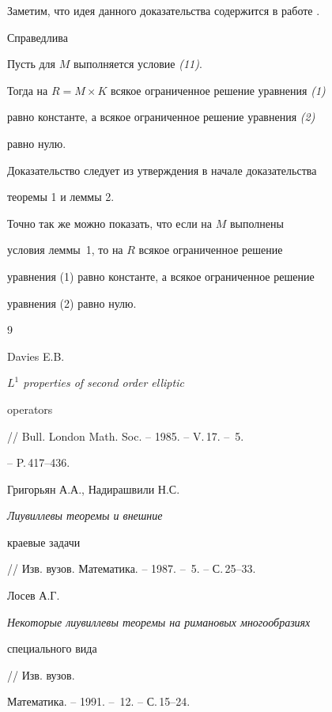 Заметим, что идея данного доказательства содержится в работе \cite{Gri}.





Справедлива





\begin{thm} Пусть для $M$ выполняется условие {\em (11)}.


Тогда на $R = M \times K$ всякое ограниченное решение уравнения {\em (1)}


равно константе, а всякое ограниченное решение уравнения {\em (2)}


равно нулю.


\end{thm}





Доказательство следует из утверждения в начале доказательства


теоремы 1 и леммы 2.





\begin{note} Точно так же можно показать, что если на $M$ выполнены


условия леммы~1, то на $R$ всякое ограниченное решение


уравнения (1) равно константе, а всякое ограниченное решение


уравнения (2) равно нулю.


\end{note}





\begin{thebibliography}{9} 


 




Davies E.B. {\em $L^1$ properties of second order elliptic


operators} // Bull. London Math. Soc. -- 1985. -- V.\,17. -- \No\,5.


-- P.\,417--436.







Григорьян А.А., Надирашвили Н.С. {\em Лиувиллевы теоремы и внешние


краевые задачи} // Изв. вузов. Математика. -- 1987. -- \No\,5. -- С.\,25--33.







Лосев А.Г. {\em Некоторые лиувиллевы теоремы на римановых многообразиях


специального вида} // Изв. вузов.


Математика. -- 1991. -- \No\,12. -- С.\,15--24.





\end{thebibliography} 


